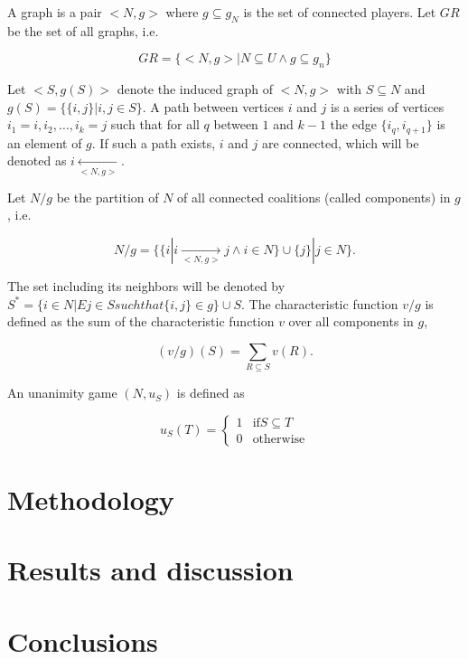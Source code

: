 \documentclass[twoside,twocolumn,9pt]{article}
\begin{document}
A graph is a pair $<N, g>$ where $g \subseteq g_N$ is the set of connected players.
Let $GR$ be the set of all graphs, i.e.

\begin{equation}
	GR = \{ <N, g> | N \subseteq U \land g \subseteq g_n \}
\end{equation}

Let $<S, g(S)>$ denote the induced graph of $<N, g>$ with $S \subseteq N$ and $g(S) = \{\{i, j \} | i, j \in S\}$.
A path between vertices $i$ and $j$ is a series of vertices $i_1 = i, i_2, \dots, i_k = j$ such that for all $q$ between
$1$ and $k-1$ the edge $\{i_q, i_{q+1}\}$ is an element of $g$. If such a path exists, $i$ and $j$ are connected, which
will be denoted as $i \underset{<N, g>}{\leftarrow}$.

Let $N/g$ be the partition of $N$ of all connected coalitions (called components) in $g$, i.e.

\begin{equation}
	N/g = \{\{ i | i \underset{<N, g>}{\rightarrow} j \land i \in N \} \cup \{j\} | j \in N \}.
\end{equation}

The set including its neighbors will be denoted by $S^* = \{ i \in N | E j \in S such that \{i, j\} \in g\} \cup S$.
The characteristic function $v/g$ is defined as the sum of the characteristic function $v$ over all components in $g$,

\begin{equation}
	(v/g)(S) = \sum_{R \subseteq S} v(R).
\end{equation}

An unanimity game $(N, u_S)$ is defined as

\begin{equation}
	u_S(T) = \begin{cases}
		1 & \text{if} S \subseteq T \\
		0 & \text{otherwise}
	\end{cases}
\end{equation}


\section{Methodology}

\section{Results and discussion}

\section{Conclusions}
\end{document}
